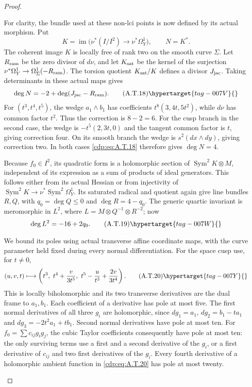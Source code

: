 \begin{proof}
\begin{enumerate}[label={$\langle1\rangle$\arabic*.},leftmargin=*]
For clarity, the bundle used at these non-lci points
is now defined by its actual morphism. Put
\[
 K=\operatorname{im}\bigl(\nu^*(I/I^2)
                         \longrightarrow\nu^*\Omega_Y^1\bigr),
 \qquad N=K^*.
\]
The coherent image $K$ is locally free of rank two
on the smooth curve $\Sigma$. Let $R_{\rm ram}$ be
the zero divisor of $d\nu$, and let $K_{\rm sat}$
be the kernel of the surjection
$\nu^*\Omega_Y^1\to\Omega_\Sigma^1(-R_{\rm ram})$.
The torsion quotient $K_{\rm sat}/K$ defines a divisor
$J_{\rm jac}$. Taking determinants in these actual
maps gives
\[
 \deg N=-2+\deg(J_{\rm jac}-R_{\rm ram}).         \tag{A.T.18}\hypertarget{tag-007V}{}\label{cdp:eq:A.T.18}
\]
For $(t^3,t^4,t^5)$, the wedge $a_1\wedge b_1$
has coefficients $t^8(3,4t,5t^2)$, while $d\nu$
has common factor $t^2$. Thus the correction is
$8-2=6$. For the cusp branch in the second case,
the wedge is $-t^5(2,3t,0)$ and the tangent common
factor is $t$, giving correction four. On its
smooth branch the wedge is $s^2(dx\wedge dy)$,
giving correction two. In both cases \eqref{cdp:eq:A.T.18}
therefore gives $\deg N=4$.

Because $f_0\in I^2$, its quadratic form is a
holomorphic section of $\operatorname{Sym}^2K\otimes M$,
independent of its expression as a sum of products
of ideal generators. This follows either from its
actual Hessian or from injectivity of
$\operatorname{Sym}^2K\to\nu^*\operatorname{Sym}^2\Omega_Y^1$.
Its saturated radical and quotient again give line
bundles $R,Q$, with $q_0=\deg Q\le0$ and
$\deg R=4-q_0$. The generic quartic invariant
is meromorphic in $L^2$, where
$L=M\otimes Q^{-1}\otimes R^{-2}$; now
\[
                        \deg L^2=-16+2q_0.        \tag{A.T.19}\hypertarget{tag-007W}{}\label{cdp:eq:A.T.19}
\]

We bound its poles using actual transverse affine
coordinate maps, with the curve parameter held
fixed during every normal differentiation. For the
space cusp use, for $t\ne0$,
\[
 (u,v,t)\longmapsto
 \left(t^3,\ t^4+\frac{v}{3t^5},\
                   t^5-\frac{u}{t^3}+\frac{2v}{3t^4}\right).
                                                        \tag{A.T.20}\hypertarget{tag-007Y}{}\label{cdp:eq:A.T.20}
\]
This is locally biholomorphic and its two transverse
derivatives are the dual frame to $a_1,b_1$.
Each coefficient of a derivative has pole at most
five. The first normal derivatives of all three
$g_i$ are holomorphic, since
$dg_1=a_1$, $dg_2=b_1-ta_1$ and
$dg_3=-2t^2a_1+t b_1$.
Second normal derivatives have pole at most ten.
For $f_0=\sum c_{ij}g_i g_j$, the cubic Taylor
coefficients consequently have pole at most ten:
the only surviving terms use a first and a second
derivative of the $g_i$, or a first derivative of
$c_{ij}$ and two first derivatives of the $g_i$.
Every fourth derivative of a holomorphic ambient
function in \eqref{cdp:eq:A.T.20} has pole at most twenty.


\end{enumerate}
\end{proof}
